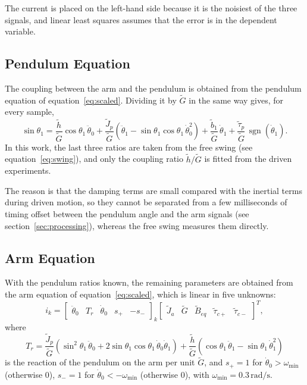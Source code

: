 \documentclass[a4paper,11pt]{article}
\newcommand{\sgn}{\operatorname{sgn}}
\begin{document}
The current is placed on the left-hand side because it is the noisiest of the three signals, and linear least squares assumes that the error is in the dependent variable.

\subsection{Pendulum Equation}
The coupling between the arm and the pendulum is obtained from the pendulum equation of equation~\ref{eq:scaled}. Dividing it by $\tilde G$ in the same way gives, for every sample,
\begin{equation}
  \sin\theta_1 = \frac{\tilde h}{\tilde G}\cos\theta_1\,\ddot\theta_0 + \frac{\tilde J_p}{\tilde G}\left(\ddot\theta_1 - \sin\theta_1 \cos\theta_1\, \dot\theta_0^2\right) + \frac{\tilde b_1}{\tilde G}\,\dot\theta_1 + \frac{\tilde\tau_p}{\tilde G}\,\sgn(\dot\theta_1) .
  \label{eq:pend_reg}
\end{equation}
In this work, the last three ratios are taken from the free swing (see equation~\ref{eq:swing}), and only the coupling ratio $\tilde h/\tilde G$ is fitted from the driven experiments.

The reason is that the damping terms are small compared with the inertial terms during driven motion, so they cannot be separated from a few milliseconds of timing offset between the pendulum angle and the arm signals (see section~\ref{sec:processing}), whereas the free swing measures them directly.

\subsection{Arm Equation}
With the pendulum ratios known, the remaining parameters are obtained from the arm equation of equation~\ref{eq:scaled}, which is linear in five unknowns:
\begin{equation}
  i_k = \begin{bmatrix} \ddot\theta_0 & T_r & \dot\theta_0 & s_+ & -s_- \end{bmatrix}_k
  \begin{bmatrix} \tilde J_a & \tilde G & \tilde B_{eq} & \tilde\tau_{c+} & \tilde\tau_{c-} \end{bmatrix}^T ,
  \label{eq:arm_reg}
\end{equation}
where
\begin{equation}
  T_r = \frac{\tilde J_p}{\tilde G}\left(\sin^2\theta_1\, \ddot\theta_0 + 2 \sin\theta_1 \cos\theta_1\, \dot\theta_0 \dot\theta_1\right) + \frac{\tilde h}{\tilde G}\left(\cos\theta_1\, \ddot\theta_1 - \sin\theta_1\, \dot\theta_1^2\right)
\end{equation}
is the reaction of the pendulum on the arm per unit $\tilde G$, and $s_+ = 1$ for $\dot\theta_0 > \omega_{\min}$ (otherwise 0), $s_- = 1$ for $\dot\theta_0 < -\omega_{\min}$ (otherwise 0), with $\omega_{\min} = 0.3\,\mathrm{rad/s}$.
\end{document}
